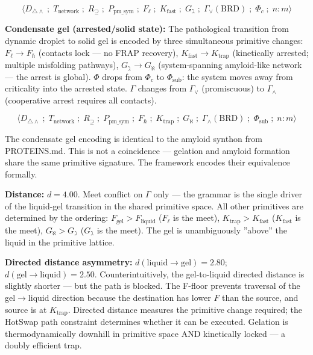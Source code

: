 \documentclass[12pt,a4paper]{article}
\begin{document}
\[\langle D_{\triangle\wedge} \;;\; T_\text{network} \;;\; R_{\supseteq} \;;\; P_{\text{pm\_sym}} \;;\; F_\ell \;;\; K_\text{fast} \;;\; G_\gimel \;;\; \Gamma_\vee(\text{BRD}) \;;\; \Phi_c \;;\; n:m \rangle\]

\textbf{Condensate gel (arrested/solid state):} The pathological transition from dynamic droplet to solid gel is encoded by three simultaneous primitive changes: $F_\ell \to F_\hbar$ (contacts lock --- no FRAP recovery), $K_\text{fast} \to K_\text{trap}$ (kinetically arrested; multiple misfolding pathways), $G_\gimel \to G_\aleph$ (system-spanning amyloid-like network --- the arrest is global). $\Phi$ drops from $\Phi_c$ to $\Phi_\text{sub}$: the system moves away from criticality into the arrested state. $\Gamma$ changes from $\Gamma_\vee$ (promiscuous) to $\Gamma_\wedge$ (cooperative arrest requires all contacts).

\[\langle D_{\triangle\wedge} \;;\; T_\text{network} \;;\; R_{\supseteq} \;;\; P_{\text{pm\_sym}} \;;\; F_\hbar \;;\; K_\text{trap} \;;\; G_\aleph \;;\; \Gamma_\wedge(\text{BRD}) \;;\; \Phi_\text{sub} \;;\; n:m \rangle\]

The condensate gel encoding is identical to the amyloid synthon from PROTEINS.md. This is not a coincidence --- gelation and amyloid formation share the same primitive signature. The framework encodes their equivalence formally.

\textbf{Distance:} $d = 4.00$. Meet conflict on $\Gamma$ only --- the grammar is the single driver of the liquid-gel transition in the shared primitive space. All other primitives are determined by the ordering: $F_\text{gel} > F_\text{liquid}$ ($F_\ell$ is the meet), $K_\text{trap} > K_\text{fast}$ ($K_\text{fast}$ is the meet), $G_\aleph > G_\gimel$ ($G_\gimel$ is the meet). The gel is unambiguously ''above'' the liquid in the primitive lattice.

\textbf{Directed distance asymmetry:} $d(\text{liquid} \to \text{gel}) = 2.80$; $d(\text{gel} \to \text{liquid}) = 2.50$. Counterintuitively, the gel-to-liquid directed distance is slightly shorter --- but the path is blocked. The F-floor prevents traversal of the gel$\rightarrow$liquid direction because the destination has lower $F$ than the source, and source is at $K_\text{trap}$. Directed distance measures the primitive change required; the HotSwap path constraint determines whether it can be executed. Gelation is thermodynamically downhill in primitive space AND kinetically locked --- a doubly efficient trap.
\end{document}
